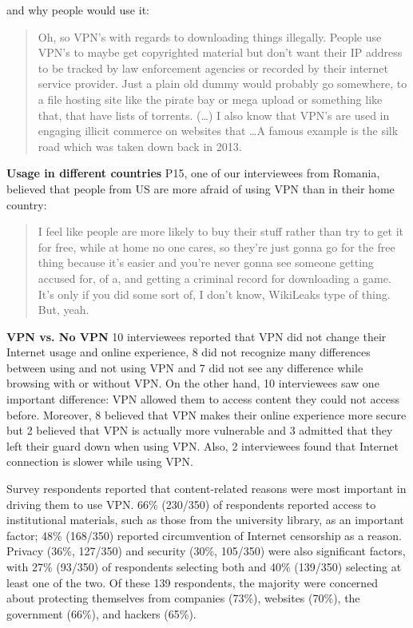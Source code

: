 and why people would use it:
\begin{quote}Oh, so VPN's with regards to downloading things illegally. People use VPN's to maybe get copyrighted material but don't want their IP address to be tracked by law enforcement agencies or recorded by their internet service provider. Just a plain old dummy would probably go somewhere, to a file hosting site like the pirate bay or mega upload or something like that, that have lists of torrents. (\dots) I also know that VPN's are used in engaging illicit commerce on websites that \dots A famous example is the silk road which was taken down back in 2013. \end{quote}

\textbf{Usage in different countries}
P15, one of our interviewees from Romania, believed that people from US are more afraid of using VPN than in their home country:
\begin{quote}I feel like people are more likely to buy their stuff rather than try to get it for free, while at home no one cares, so they're just gonna go for the free thing because it's easier and you're never gonna see someone getting accused for, of a, and getting a criminal record for downloading a game. It's only if you did some sort of, I don't know, WikiLeaks type of thing. But, yeah.\end{quote}

\textbf{VPN vs. No VPN}
10 interviewees reported that VPN did not change their Internet usage and online experience, 8 did not recognize many differences between using and not using VPN and 7 did not see any difference while browsing with or without VPN. On the other hand, 10 interviewees saw one important difference: VPN allowed them to access content they could not access before. Moreover, 8 believed that VPN makes their online experience more secure but 2 believed that VPN is actually more vulnerable and 3 admitted that they left their guard down when using VPN. Also, 2 interviewees found that Internet connection is slower while using VPN.

Survey respondents reported that content-related reasons were most important in driving them to use VPN. 66\% (230/350) of respondents reported access to institutional materials, such as those from the university library, as an important factor; 48\% (168/350) reported circumvention of Internet censorship as a reason. Privacy (36\%, 127/350) and security (30\%, 105/350) were also significant factors, with 27\% (93/350) of respondents selecting both and 40\% (139/350) selecting at least one of the two. Of these 139 respondents, the majority were concerned about protecting themselves from companies (73\%), websites (70\%), the government (66\%), and hackers (65\%).

